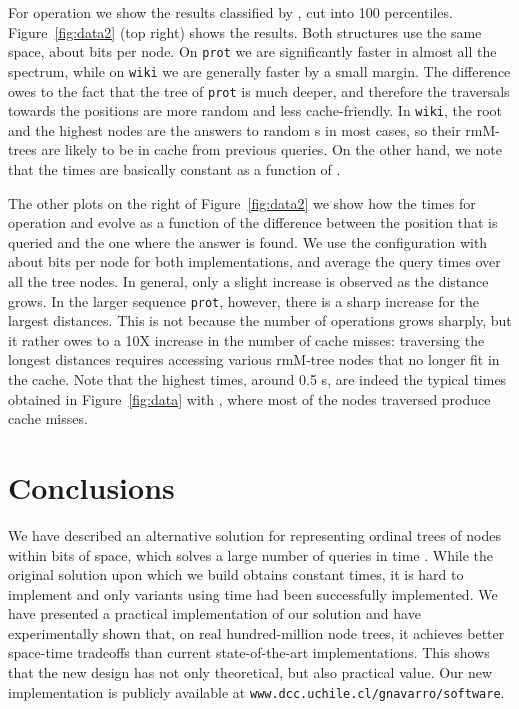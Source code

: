 \documentclass[11pt]{article}
\newcommand{\0}{\mathit{0}}
\newcommand{\1}{\mathit{1}}
\begin{document}
For operation  we show the results classified by , cut into 100 
percentiles. Figure~\ref{fig:data2} (top right) shows the results.
Both structures use the same space, about  bits per node.
On \texttt{prot} we are significantly faster in almost all the spectrum, while 
on \texttt{wiki} we are generally faster by a small margin. The difference owes
to the fact that the tree of \texttt{prot} is much deeper, and therefore the
traversals towards the  positions are more random and less cache-friendly.
In \texttt{wiki}, the root and the highest nodes are the answers to random
s in most cases, so their rmM-trees are likely to be in cache from 
previous queries. On the other hand, we note that the times are basically
constant as a function of .

The other plots on the right of Figure~\ref{fig:data2} we show how the times for
operation  and  evolve as a function of the difference between 
the position that is queried and the one where the answer is found. We use the 
configuration with about  bits per node for both implementations, and
average the query times over all the tree nodes. In general, only a slight 
increase is observed as the distance grows. In the larger sequence {\tt prot}, 
however, there is a sharp increase for the largest distances. This is not 
because the number of operations grows sharply, but it rather owes to a 10X 
increase in the number of cache misses: traversing the
longest distances requires accessing various rmM-tree nodes that no longer fit
in the cache. Note that the highest times, around 0.5 s, are indeed the
typical times obtained in Figure~\ref{fig:data} with , where most of 
the nodes traversed produce cache misses.

\section{Conclusions}

We have described an alternative solution for representing ordinal trees of 
nodes within  bits of space, which solves a large number of
queries in time . While the original solution upon which we
build \cite{NS14} obtains constant times, it is hard to implement and only
variants using  time had been successfully implemented.  We have
presented a practical implementation of our solution and have experimentally
shown that, on real hundred-million node trees, it achieves better space-time
tradeoffs than current state-of-the-art implementations. This shows that the
new design has not only theoretical, but also practical value. Our new
implementation is publicly available at 
{\tt www.dcc.uchile.cl/gnavarro/software}.









\end{document}
